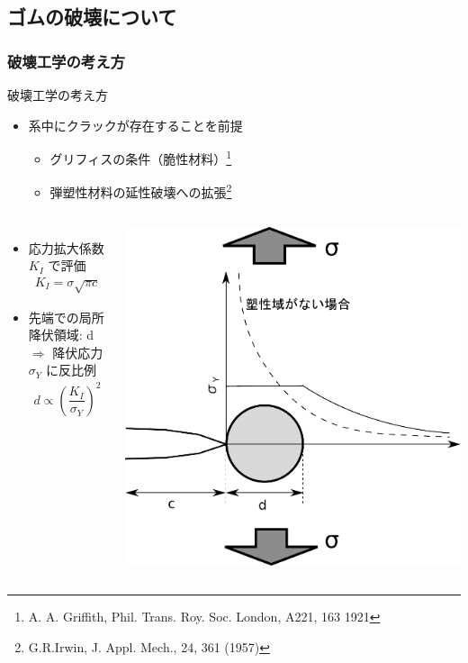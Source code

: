 \documentclass[12pt, dvipdfmx]{beamer}
\begin{document}
\subsection{ゴムの破壊について}
\begin{frame}
    \frametitle{破壊工学の考え方}
	\vspace{-2mm}
    \begin{exampleblock}{破壊工学の考え方}
		\begin{itemize}
			\item 系中に\alert{クラックが存在することを前提}
			\begin{itemize}
				\item グリフィスの条件（脆性材料）\footnote[1]{
					A. A. Griffith, Phil. Trans. Roy. Soc. London, A221, 163 {1921}
					}
					\item 弾塑性材料の延性破壊への拡張\footnote[2]{
						G.R.Irwin, J. Appl. Mech., 24, 361 (1957)
						}
			\end{itemize}
		\end{itemize}
	\end{exampleblock}
	\vspace{-2mm}
	\begin{columns}
			\begin{itemize}
				\item
				\alert{応力拡大係数 $K_I$} で評価
				\footnotesize
				\begin{align*}
				K_{I} = \sigma \sqrt{\pi c}
				\end{align*}
				\normalsize
				\item 
				先端での\alert{局所降伏領域: d}\\
				$\Rightarrow$ 降伏応力 $\sigma_Y$ に反比例
				\footnotesize
				\begin{align*}
				d \propto \left( \dfrac{K_I}{\sigma_Y} \right)^2
				\end{align*}
				\normalsize
			\end{itemize}
			\centering
			\includegraphics[width=.82\textwidth]{./Crack_Yield.pdf}
		\end{columns}
\end{frame}
\end{document}

